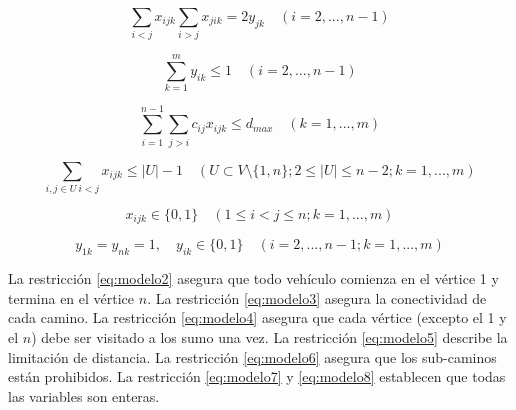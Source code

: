 \begin{equation} \label{eq:modelo3}
\sum_{i<j} x_{ijk} \sum_{i>j} x_{jik} = 2y_{jk} \quad (i =2,...,n-1)
\end{equation}

\begin{equation} \label{eq:modelo4}
\sum_{k=1}^{m} y_{ik} \leq 1 \quad (i =2,...,n-1)
\end{equation}

\begin{equation} \label{eq:modelo5}
\sum_{i=1}^{n-1} \sum_{j>i} c_{ij}x_{ijk} \leq d_{max} \quad (k=1,...,m)
\end{equation}

\begin{equation} \label{eq:modelo6}
\sum_{i,j\in U \ i<j} x_{ijk} \leq |U|-1 \quad (U \subset V \setminus \{1,n\} ; 2 \leq |U| \leq n-2; k=1,...,m)
\end{equation}

\begin{equation} \label{eq:modelo7}
x_{ijk} \in \{0,1\} \quad (1 \leq i < j \leq n; k=1,...,m)
\end{equation}

\begin{equation} \label{eq:modelo8}
y_{1k} = y_{nk} = 1, \quad y_{ik} \in \{0,1\} \quad (i = 2,...,n-1; k=1,...,m)
\end{equation}

La restricción \ref{eq:modelo2} asegura que todo vehículo comienza en el vértice 1 y termina en el vértice $n$. La restricción \ref{eq:modelo3} asegura la conectividad de cada camino. La restricción \ref{eq:modelo4} asegura que cada vértice (excepto el 1 y el $n$) debe ser visitado a los sumo una vez. La restricción \ref{eq:modelo5} describe la limitación de distancia. La restricción \ref{eq:modelo6} asegura que los sub-caminos están prohibidos. La restricción \ref{eq:modelo7} y \ref{eq:modelo8} establecen que todas las variables son enteras.


